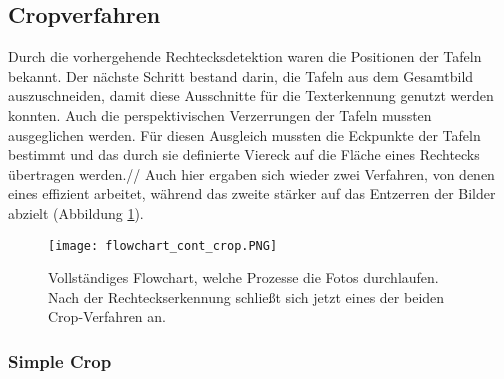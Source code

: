 \subsection{Cropverfahren}

Durch die vorhergehende Rechtecksdetektion waren die Positionen der Tafeln bekannt. Der nächste Schritt bestand darin, die Tafeln aus dem Gesamtbild auszuschneiden, damit diese Ausschnitte für die Texterkennung genutzt werden konnten. Auch die perspektivischen Verzerrungen der Tafeln mussten ausgeglichen werden. Für diesen Ausgleich mussten die Eckpunkte der Tafeln bestimmt und das durch sie definierte Viereck auf die Fläche eines Rechtecks übertragen werden.//
Auch hier ergaben sich wieder zwei Verfahren, von denen eines effizient arbeitet, während das zweite stärker auf das Entzerren der Bilder abzielt (Abbildung  \ref{fig:flowchartcrop}).
\begin{figure}[h!]
\centering
\texttt{[image: flowchart\_cont\_crop.PNG]}
\caption{Vollständiges Flowchart, welche Prozesse die Fotos durchlaufen. Nach der Rechteckserkennung schließt sich jetzt eines der beiden Crop-Verfahren an.}
\label{fig:flowchartcrop}
\end{figure}

\subsubsection{Simple Crop}

